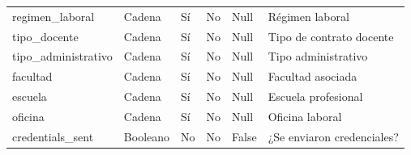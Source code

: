 \documentclass{article}
\begin{document}
\begin{longtable}{|l|l|l|l|l|l|}
regimen\_laboral & Cadena & Sí & No & Null & Régimen laboral \\
tipo\_docente & Cadena & Sí & No & Null & Tipo de contrato docente \\
tipo\_administrativo & Cadena & Sí & No & Null & Tipo administrativo \\
facultad & Cadena & Sí & No & Null & Facultad asociada \\
escuela & Cadena & Sí & No & Null & Escuela profesional \\
oficina & Cadena & Sí & No & Null & Oficina laboral \\
credentials\_sent & Booleano & No & No & False & ¿Se enviaron credenciales? \\
\hline
\end{longtable}

\end{document}
